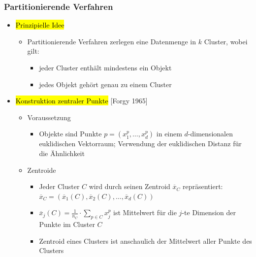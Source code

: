 \begin{frame}%
\frametitle{Partitionierende Verfahren}

\begin{itemize}
\item \hl{Prinzipielle Idee}
\begin{itemize}
\item Partitionierende Verfahren zerlegen eine Datenmenge in $k$
  Cluster, wobei gilt:
\begin{itemize}
\item jeder Cluster enthält mindestens ein Objekt
\item jedes Objekt gehört genau zu einem Cluster
\end{itemize}
\end{itemize}
\item \hl{Konstruktion zentraler Punkte} [Forgy 1965]
\begin{itemize}
\item Voraussetzung
\begin{itemize}
\item Objekte sind Punkte $p=(x^p_1, \dots, x^p_d)$ in einem
  $d$-dimensionalen euklidischen Vektorraum; Verwendung der
  euklidischen Distanz für die Ähnlichkeit
\end{itemize}
\item Zentroide
\begin{itemize}
\item Jeder Cluster $C$ wird durch seinen Zentroid $\overline{x}_C$
  repräsentiert: $\overline{x}_C=(\overline{x}_1(C),
  \overline{x}_2(C), \dots, \overline{x}_d(C))$
\item $\overline{x}_j(C)=\frac{1}{n_C}\cdot\sum_{p\in C}x^p_j$ ist
  Mittelwert für die $j$-te Dimension der Punkte im Cluster $C$
\item Zentroid eines Clusters ist anschaulich der Mittelwert aller
  Punkte des Clusters
\end{itemize}
\end{itemize}
\end{itemize}

\end{frame}


